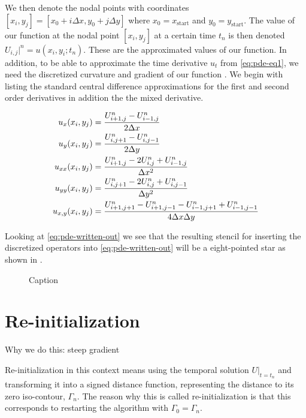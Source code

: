 We then denote the nodal points with coordinates $[x_i, y_j] = [x_0 + i\Delta x, y_0+j\Delta y]$ where $x_0 = x_{\text{start}}$ and $y_0 = y_{\text{start}}$. The value of our function \uxt at the nodal point $[x_i, y_j]$  at a certain time $t_n$ is then denoted $U_{i, j}|^n = u(x_i, y_i; t_n)$. These are the approximated values of our function. In addition, to be able to approximate the time derivative $u_t$ from \eqref{eq:pde-eq1}, we need the discretized curvature and gradient of our function \uxt. We begin with listing the standard central difference approximations for the first and second order derivatives in addition the the mixed derivative.

\begin{align}
    u_x (x_i, y_j) &= \frac{U_{i+1, j}^n - U_{i-1, j}^n}{2\Delta x} \label{eq:x-deriv}\\
    u_y (x_i, y_j) &= \frac{U_{i, j+1}^n - U_{i, j-1}^n}{2\Delta y} \label{eq:y-deriv} \\
    u_{xx} (x_i, y_j) &= \frac{U_{i+1, j}^n-2U_{i, j}^n+U_{i-1, j}^n}{\Delta x ^2} \label{eq:x-doublederiv} \\
    u_{yy} (x_i, y_j) &= \frac{U_{i, j+1}^n - 2U_{i, j}^n + U_{i, j-1}^n}{\Delta y^2} \label{eq:y-doublederiv} \\
    u_{x, y} (x_i, y_j) &= \frac{U_{i+1, j+1}^n-U_{i+1, j-1}^n-U_{i-1, j+1}^n+U_{i-1, j-1}^n}{4\Delta x \Delta y}
\end{align}

Looking at \eqref{eq:pde-written-out} we see that the resulting stencil for inserting the discretized operators into \eqref{eq:pde-written-out} will be a eight-pointed star as shown in .


\begin{figure}
    \centering
    
    \caption{Caption}
    \label{fig:stencil+grid}
\end{figure}




\section{Re-initialization}
Why we do this: steep gradient

Re-initialization in this context means using the temporal solution $U|_{t=t_n}$ and transforming it into a signed distance function, representing the distance to its zero iso-contour, $\Gamma_{n}$. The reason why this is called re-initialization is that this corresponds to restarting the algorithm with $\Gamma_0 = \Gamma_{n}$.



